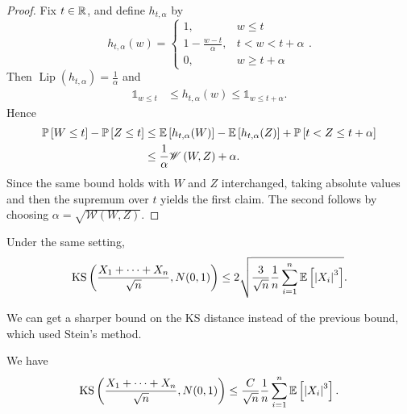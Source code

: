 \begin{proof}
	Fix $t \in \mathbb{R}$, and define $h_{t,\alpha}$ by
	\[
		h_{t,\alpha}(w) =
		\begin{cases}
			1, & w \le t \\
			1 - \frac{w-t}{\alpha}, & t < w < t+\alpha \\
			0, & w \ge t+\alpha
		\end{cases}
	.\]
	Then $\operatorname{Lip}(h_{t,\alpha}) = \frac{1}{\alpha}$ and
	\begin{align*}
		\mathds{1}_{w \le t} &\le h_{t,\alpha}(w) \le \mathds{1}_{w \le t+\alpha}.
	\end{align*}
	Hence
	\begin{align*}
		\mathbb{P}\left[W \le t\right] - \mathbb{P}\left[Z \le t\right] 
					&\le \mathbb{E}\left[h_{t,\alpha}(W)\right] - \mathbb{E}\left[h_{t,\alpha}(Z)\right] + \mathbb{P}\left[t < Z \le t+\alpha\right] \\
					&\le \frac{1}{\alpha}\mathscr{W}\left( W,Z \right) + \alpha
	.\end{align*}
	Since the same bound holds with $W$ and $Z$ interchanged, taking absolute values and then the supremum over $t$ yields the first claim. The second follows by choosing $\alpha = \sqrt{\mathscr{W}(W,Z)}$.
\end{proof}

\begin{corollary}
	Under the same setting, \[
		\operatorname{KS}\left( \frac{X_1+\cdots+X_n}{\sqrt{n} }, N(0,1) \right) \le 2 \sqrt{\frac{3}{\sqrt{n} } \frac{1}{n} \sum\limits_{i=1}^{n} \mathbb{E}\left[\left| X_i \right|^3\right] } 
	.\] 
\end{corollary}

We can get a sharper bound on the KS distance instead of the previous bound, which used Stein's method.

\begin{proposition}
	We have \[
		\operatorname{KS}\left( \frac{X_1+\cdots+X_n}{\sqrt{n} },N(0,1) \right) \le \frac{C}{\sqrt{n} } \frac{1}{n} \sum\limits_{i=1}^{n} \mathbb{E}\left[\left| X_i \right|^3\right] 
	.\] 
\end{proposition}
